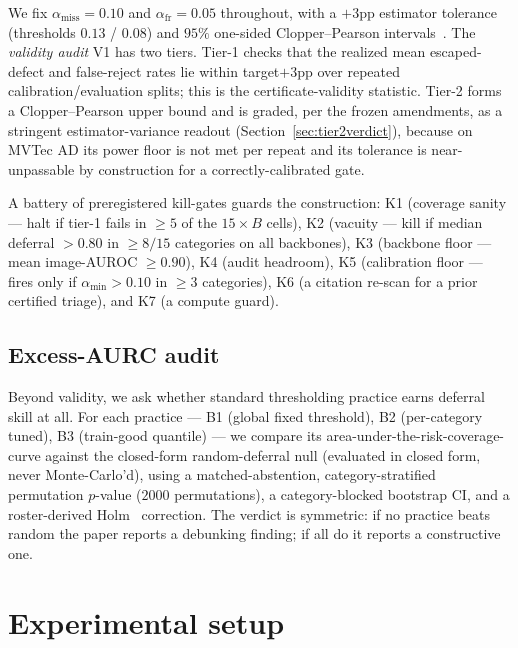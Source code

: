 \documentclass[11pt]{article}
\begin{document}
We fix $\alpha_{\text{miss}}=0.10$ and $\alpha_{\text{fr}}=0.05$ throughout, with a $+3$pp
estimator tolerance (thresholds $0.13$ / $0.08$) and $95\%$ one-sided Clopper--Pearson
intervals~\citep{clopper1934use}.
The \emph{validity audit} V1 has two tiers. Tier-1 checks that the realized mean escaped-defect and
false-reject rates lie within target$+3$pp over repeated calibration/evaluation splits; this is the
certificate-validity statistic. Tier-2 forms a Clopper--Pearson upper bound and is graded, per the
frozen amendments, as a stringent estimator-variance readout (Section~\ref{sec:tier2verdict}),
because on MVTec AD its power floor is not met per repeat and its tolerance is near-unpassable by
construction for a correctly-calibrated gate.

A battery of preregistered kill-gates guards the construction: K1 (coverage sanity --- halt if
tier-1 fails in $\ge 5$ of the $15\!\times\!B$ cells), K2 (vacuity --- kill if median deferral
$>0.80$ in $\ge 8/15$ categories on all backbones), K3 (backbone floor --- mean image-AUROC
$\ge 0.90$), K4 (audit headroom), K5 (calibration floor --- fires only if $\alpha_{\min}>0.10$ in
$\ge 3$ categories), K6 (a citation re-scan for a prior certified triage), and K7 (a compute guard).

\subsection{Excess-AURC audit}
\label{sec:audit}

Beyond validity, we ask whether standard thresholding practice earns deferral skill at all.
For each practice --- B1 (global fixed threshold), B2 (per-category tuned), B3 (train-good quantile)
--- we compare its area-under-the-risk-coverage-curve against the closed-form random-deferral null
(evaluated in closed form, never Monte-Carlo'd), using a matched-abstention,
category-stratified permutation $p$-value ($2000$ permutations), a category-blocked bootstrap CI,
and a roster-derived Holm~\citep{holm1979simple} correction. The verdict is symmetric: if no
practice beats random the paper reports a debunking finding; if all do it reports a constructive one.

\section{Experimental setup}
\label{sec:setup}
\end{document}
